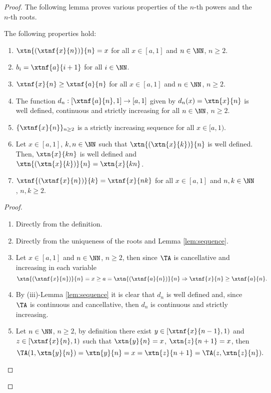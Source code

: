 \begin{proof}
	The following lemma proves various properties of the $n$-th powers and the $n$-th roots.
	
	\begin{sublemma} \label{lem:1-propertiespowers}
		The following properties hold:
		\begin{enumerate}[label=(\roman*)]
			\item $\xtn{(\xtnf{x}{n})}{n}=x$ for all $x \in [a,1]$ and $n \in \NN$, $n \geq 2$.
			\item $b_i = \xtnf{a}{i+1}$ for all $i \in \NN$.
			\item $\xtnf{x}{n} \geq \xtnf{a}{n}$ for all $x \in [a,1]$ and $n \in \NN$, $n \geq 2$.
			\item The function $d_n : [\xtnf{a}{n},1] \to [a,1]$ given by $d_n(x)=\xtn{x}{n}$ is well defined, continuous and strictly increasing for all $n \in \NN$, $n \geq 2$.
			\item $\{\xtnf{x}{n}\}_{n \geq 2}$ is a strictly increasing sequence for all $x \in [a,1)$.
			\item Let $x \in [a,1]$, $k,n \in \NN$ such that $\xtn{(\xtn{x}{k})}{n}$ is well defined. Then, $\xtn{x}{kn}$ is well defined and $\xtn{(\xtn{x}{k})}{n} = \xtn{x}{kn}$.
			\item $\xtnf{(\xtnf{x}{n})}{k} = \xtnf{x}{nk}$ for all $x \in [a,1]$ and $n,k \in \NN$, $n,k \geq 2$.
		\end{enumerate}
	\end{sublemma}
	\begin{proof}
		\begin{enumerate}[label=(\roman*)]
			\item Directly from the definition.
			\item Directly from the uniqueness of the roots and Lemma \ref{lem:sequence}.
			\item Let $x \in [a,1]$ and $n \in \NN$, $n \geq 2$, then since $\TA$ is cancellative  and increasing in each variable
			$$\xtn{(\xtnf{x}{n})}{n}=x \geq a = \xtn{(\xtnf{a}{n})}{n} \Rightarrow \xtnf{x}{n} \geq \xtnf{a}{n}.$$
			\item By (iii)-Lemma \ref{lem:sequence} it is clear that $d_n$ is well defined and, since $\TA$ is continuous and cancellative, then $d_n$ is continuous and strictly increasing.
			\item Let $n \in \NN$, $n \geq 2$, by definition there exist $y \in \left[\xtnf{x}{n-1},1\right)$ and $z \in \left[\xtnf{x}{n},1\right)$ such that $\xtn{y}{n}=x$, $\xtn{z}{n+1}=x$, then
			$$\TA(1,\xtn{y}{n})=\xtn{y}{n}=x=\xtn{z}{n+1}=\TA(z,\xtn{z}{n}).$$

\end{enumerate}
\end{proof}
\end{proof}
